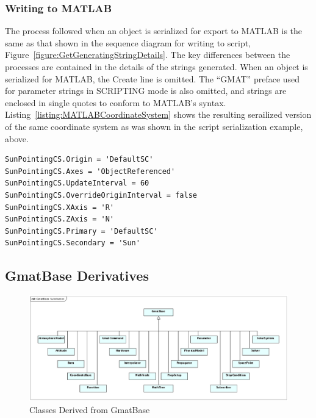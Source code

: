 \subsubsection{Writing to MATLAB}

The process followed when an object is serialized for export to MATLAB is the same as that shown in
the sequence diagram for writing to script, Figure~\ref{figure:GetGeneratingStringDetails}.  The
key differences between the processes are contained in the details of the strings generated.  When
an object is serialized for MATLAB, the Create line is omitted.  The ``GMAT'' preface used for
parameter strings in SCRIPTING mode is also omitted, and strings are enclosed in single quotes to
conform to MATLAB's syntax.  Listing~\ref{listing:MATLABCoordinateSystem} shows the resulting
serailized version of the same coordinate system as was shown in the script serialization example,
above.

\begin{lstlisting}[caption={MATLAB Listing for a Coordinate System},
label={listing:MATLABCoordinateSystem}]
SunPointingCS.Origin = 'DefaultSC'
SunPointingCS.Axes = 'ObjectReferenced'
SunPointingCS.UpdateInterval = 60
SunPointingCS.OverrideOriginInterval = false
SunPointingCS.XAxis = 'R'
SunPointingCS.ZAxis = 'N'
SunPointingCS.Primary = 'DefaultSC'
SunPointingCS.Secondary = 'Sun'
\end{lstlisting}
\lstset{numbers=none}

\subsection{GmatBase Derivatives}

\begin{figure}[htb]
\begin{center}
\includegraphics[scale=0.5]{Images/GmatBaseSubclasses.eps}
\caption{\label{figure:GmatBaseSubclasses}Classes Derived from GmatBase}
\end{center}
\end{figure}

